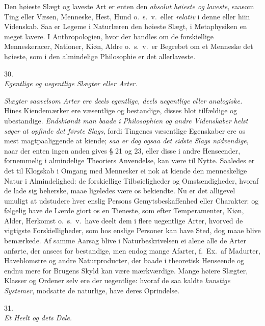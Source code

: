 \documentclass[12pt,a4paper]{article}
\newcommand{\logsec}[2]{%
  \bigskip\begin{center}{\large #1}\\[4pt]{\emph{#2}}\end{center}\smallskip}
\newcommand{\opage}[1]{\marginnote{\footnotesize\textit{[#1]}}}
\begin{document}
Den høieste Slægt og laveste Art er enten den \emph{absolut høieste og laveste},
saasom Ting eller Væsen, Menneske, Hest, Hund o.~s.~v.\ eller \emph{relativ} i
denne eller hiin Videnskab. Saa er Legeme i Naturlæren den høieste Slægt, i
Metaphysiken en meget lavere. I Anthropologien, hvor der handles om de
forskiellige Menneskeracer, Nationer, Kiøn, Aldre o.~s.~v.\ er Begrebet om et
Menneske det høieste, som i den almindelige Philosophie er det allerlaveste.

\logsec{30.}{Egentlige og uegentlige Slægter eller Arter.}

\noindent
\emph{Slægter saavelsom Arter ere deels egentlige, deels uegentlige eller
analogiske.} Hines Kiendemærker ere væsentlige og bestandige, disses blot
tilfældige og ubestandige. \emph{Endskiøndt man baade i Philosophien og andre
Videnskaber helst søger at opfinde det første Slags}, fordi Tingenes væsentlige
Egenskaber ere os mest magtpaaliggende at kiende; \emph{saa er dog ogsaa det
sidste Slags nødvendige}, naar der enten
\opage{98} ingen anden gives § 21 og 23, eller disse i andre Henseender, fornemmelig i
almindelige Theoriers Anvendelse, kan være til Nytte. Saaledes er det til
Klogskab i Omgang med Mennesker ei nok at kiende den menneskelige Natur i
Almindelighed: de forskiellige Tilbøieligheder og Omstændigheder, hvoraf de
lade sig beherske, maae ligeledes være os bekiendte. Nu er det alligevel
umuligt at udstudere hver enslig Persons Gemytsbeskaffenhed eller Charakter: og
følgelig have de Lærde giort os en Tieneste, som efter Temperamenter, Kiøn,
Alder, Herkomst o.~s.~v.\ have deelt dem i flere uegentlige Arter, hvorved de
vigtigste Forskielligheder, som hos enslige Personer kan have Sted, dog maae
blive bemærkede. Af samme Aarsag blive i Naturbeskrivelsen ei alene alle de
Arter anførte, der ansees for bestandige, men endog mange Afarter, f.~Ex.\ af
Madurter, Haveblomstre og andre Naturproducter, der baade i theoretisk
Henseende og endnu mere for Brugens Skyld kan være mærkværdige. Mange høiere
Slægter, Klasser og Ordener selv ere der uegentlige: hvoraf de saa kaldte
\emph{kunstige Systemer}, modsatte de naturlige, have deres Oprindelse.

\logsec{31.}{Et Heelt og dets Dele.}
\end{document}
